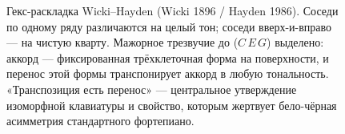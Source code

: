 \documentclass[10pt,letterpaper,twocolumn]{article}
\begin{document}
\begin{figure}[t]
\centering
{}
\caption{Гекс-раскладка Wicki--Hayden (Wicki 1896 / Hayden 1986). Соседи по одному ряду различаются на целый тон; соседи вверх-и-вправо --- на чистую кварту. Мажорное трезвучие до ($C\,E\,G$) выделено: аккорд --- фиксированная трёхклеточная форма на поверхности, и перенос этой формы транспонирует аккорд в любую тональность. «Транспозиция есть перенос» --- центральное утверждение изоморфной клавиатуры и свойство, которым жертвует бело-чёрная асимметрия стандартного фортепиано.}
\label{fig:wicki}
\end{figure}
\end{document}
